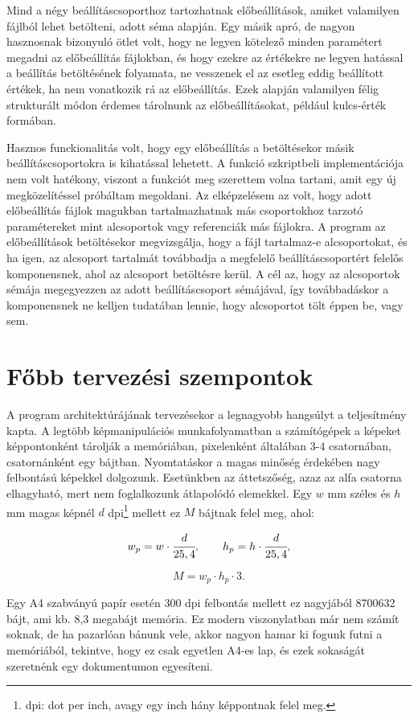 Mind a négy beállításcsoporthoz tartozhatnak előbeállítások, amiket valamilyen fájlból lehet betölteni, adott séma alapján. 
Egy másik apró, de nagyon hasznosnak bizonyuló ötlet volt, hogy ne legyen kötelező minden paramétert megadni az előbeállítás fájlokban, és hogy ezekre az értékekre ne legyen hatással a beállítás betöltésének folyamata, ne vesszenek el az esetleg eddig beállított értékek, ha nem vonatkozik rá az előbeállítás. 
Ezek alapján valamilyen félig strukturált módon érdemes tárolnunk az előbeállításokat, például kulcs-érték formában.

Hasznos funckionalitás volt, hogy egy előbeállítás a betöltésekor másik beállításcsoportokra is kihatással lehetett. A funkció szkriptbeli implementációja nem volt hatékony, viszont a funkciót meg szerettem volna tartani, amit egy új megközelítéssel próbáltam megoldani.
Az elképzelésem az volt, hogy adott előbeállítás fájlok magukban tartalmazhatnak más csoportokhoz tarzotó paramétereket mint alcsoportok vagy referenciák más fájlokra. A program az előbeállítások betöltésekor megvizsgálja, hogy a fájl tartalmaz-e alcsoportokat, és ha igen, az alcsoport tartalmát továbbadja a megfelelő beállításcsoportért felelős komponensnek, ahol az alcsoport betöltésre kerül. A cél az, hogy az alcsoportok sémája megegyezzen az adott beállításcsoport sémájával, így továbbadáskor a komponensnek ne kelljen tudatában lennie, hogy alcsoportot tölt éppen be, vagy sem.

\section{Főbb tervezési szempontok}

A program architektúrájának tervezésekor a legnagyobb hangsúlyt a teljesítmény kapta.
A legtöbb képmanipulációs munkafolyamatban a számítógépek a képeket képpontonként tárolják a memóriában, pixelenként általában 3-4 csatornában, csatornánként egy bájtban. Nyomtatáskor a magas minőség érdekében nagy felbontású képekkel dolgozunk. Esetünkben az áttetszőség, azaz az alfa csatorna elhagyható, mert nem foglalkozunk átlapolódó elemekkel. Egy $w$ mm széles és $h$ mm magas képnél $d$ dpi\footnote[7]{dpi: dot per inch, avagy egy inch hány képpontnak felel meg.} mellett ez $M$ bájtnak felel meg, ahol:

$$ w_p = w \cdot \cfrac{d}{25,4}, \qquad h_p = h \cdot \cfrac{d}{25,4},$$

$$ M = w_p \cdot h_p \cdot 3.$$

Egy A4 szabványú papír esetén 300 dpi felbontás mellett ez nagyjából 8700632 bájt, ami kb. 8,3 megabájt memória. Ez modern viszonylatban már nem számít soknak, de ha pazarlóan bánunk vele, akkor nagyon hamar ki fogunk futni a memóriából, tekintve, hogy ez csak egyetlen A4-es lap, és ezek sokaságát szeretnénk egy dokumentumon egyesíteni.

